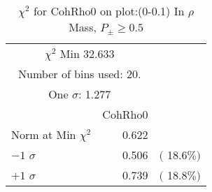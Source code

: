  \begin{table}[h!]\centering
 {\small{
 \begin{tabular}{||l||r||r||}
 \hline
 \hline
\multicolumn{2}{||c||}{$\chi^{2}$ Min  32.633} & \\
 \multicolumn{2}{||c||}{Number of bins used:   20.} & \\
\multicolumn{2}{||c||}{One $\sigma$:    1.277} & \\
 \hline
 \hline
    & CohRho0 & \\
Norm at Min $\chi^{2}$  &   0.622 & \\
$-1$ $\sigma$ &   0.506  &  $($ 18.6$\%)$  \\
$+1$ $\sigma$ &   0.739  &  $($ 18.8$\%)$  \\
 \hline
 \hline
 \end{tabular}
 \caption{$\chi^{2}$ for CohRho0 on plot:\ztrz (0-0.1) In $\rho$ Mass, $P_\pm \geq 0.5$}
 \label{tab-chicoh}
 }}
 \end{table}
 \endinput
